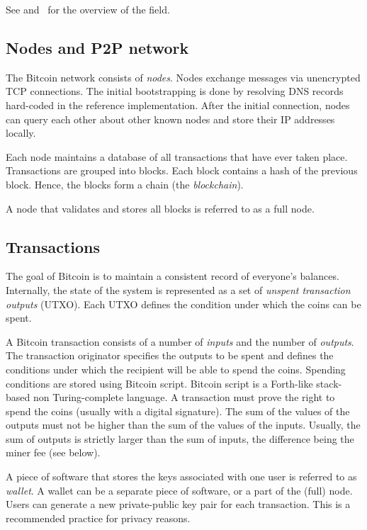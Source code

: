 See \cite{Bonneau2015} and~\cite{Tschorsch2016} for the overview of the field.


\subsection{Nodes and P2P network}

The Bitcoin network consists of \textit{nodes}.
Nodes exchange messages via unencrypted TCP connections.
The initial bootstrapping is done by resolving DNS records hard-coded in the reference implementation.
After the initial connection, nodes can query each other about other known nodes and store their IP addresses locally.

Each node maintains a database of all transactions that have ever taken place.
Transactions are grouped into blocks.
Each block contains a hash of the previous block.
Hence, the blocks form a chain (the \textit{blockchain}).

A node that validates and stores all blocks is referred to as a full node.


\subsection{Transactions}

The goal of Bitcoin is to maintain a consistent record of everyone's balances.
Internally, the state of the system is represented as a set of \textit{unspent transaction outputs} (UTXO).
Each UTXO defines the condition under which the coins can be spent.

A Bitcoin transaction consists of a number of \textit{inputs} and the number of \textit{outputs}.
The transaction originator specifies the outputs to be spent and defines the conditions under which the recipient will be able to spend the coins.
Spending conditions are stored using Bitcoin script.
Bitcoin script is a Forth-like stack-based non Turing-complete language.
A transaction must prove the right to spend the coins (usually with a digital signature).
The sum of the values of the outputs must not be higher than the sum of the values of the inputs.
Usually, the sum of outputs is strictly larger than the sum of inputs, the difference being the miner fee (see below).

A piece of software that stores the keys associated with one user is referred to as \textit{wallet}.
A wallet can be a separate piece of software, or a part of the (full) node.
Users can generate a new private-public key pair for each transaction.
This is a recommended practice for privacy reasons.

